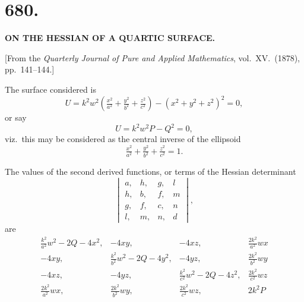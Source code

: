 \documentclass[11pt,a4paper]{article}
\begin{document}
\newpage



\section*{680.}

\begin{center}
\textbf{ON THE HESSIAN OF A QUARTIC SURFACE.}
\end{center}

\medskip

\begin{center}
[From the \emph{Quarterly Journal of Pure and Applied Mathematics}, vol.~XV.\ (1878), pp.~141--144.]
\end{center}

\medskip

\noindent The surface considered is
\[
U = k^{2}w^{2}\left(\tfrac{x^{2}}{a^{2}} + \tfrac{y^{2}}{b^{2}} + \tfrac{z^{2}}{c^{2}}\right) - (x^{2} + y^{2} + z^{2})^{2} = 0,
\]
or say
\[
U = k^{2}w^{2}P - Q^{2} = 0,
\]
viz.\ this may be considered as the central inverse of the ellipsoid
\[
\tfrac{x^{2}}{a^{2}} + \tfrac{y^{2}}{b^{2}} + \tfrac{z^{2}}{c^{2}} = 1.
\]

\medskip

The values of the second derived functions, or terms of the Hessian determinant
\[
\begin{vmatrix}
a, & h, & g, & l\\
h, & b, & f, & m\\
g, & f, & c, & n\\
l, & m, & n, & d
\end{vmatrix},
\]
are
\[
\begin{array}{cccc}
\tfrac{k^{2}}{a^{2}}w^{2} - 2Q - 4x^{2}, & -4xy, & -4xz, & \tfrac{2k^{2}}{a^{2}}wx\\[4pt]
-4xy, & \tfrac{k^{2}}{b^{2}}w^{2} - 2Q - 4y^{2}, & -4yz, & \tfrac{2k^{2}}{b^{2}}wy\\[4pt]
-4xz, & -4yz, & \tfrac{k^{2}}{c^{2}}w^{2} - 2Q - 4z^{2}, & \tfrac{2k^{2}}{c^{2}}wz\\[4pt]
\tfrac{2k^{2}}{a^{2}}wx, & \tfrac{2k^{2}}{b^{2}}wy, & \tfrac{2k^{2}}{c^{2}}wz, & 2k^{2}P
\end{array}
\]

\newpage

\end{document}
